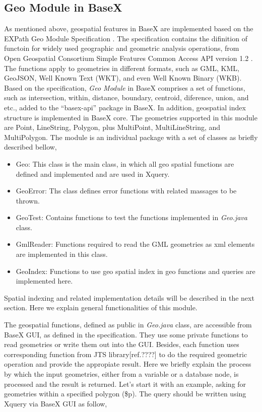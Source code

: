 \documentclass[a4paper,12pt]{article}
\begin{document}
\subsection{Geo Module in BaseX}
As mentioned above, geospatial features in BaseX are implemented based on the EXPath Geo Module Specification \cite{expath}. The specification contains the difinition of functoin for widely used geographic and geometric analysis operations, from Open Geospatial Consortium Simple Features Common Access API version 1.2 \cite{simpleFeature}. The functions apply to geometries in different formats, such as GML, KML, GeoJSON, Well Known Text (WKT), and even Well Known Binary (WKB). Based on the specification, \textit{Geo Module} in BaseX comprises a set of functions, such as intersection, within, distance, boundary, centroid, diference, union, and etc., added to the “basex-api” package in BaseX. In addition, geospatial index structure is implemented in BaseX core. The geometries supported in this module are Point, LineString, Polygon, plus MultiPoint, MultiLineString, and MultiPolygon. The module is an individual package with a set of classes as briefly described bellow,
\begin{itemize}
\item Geo: This class is the main class, in which all geo spatial functions are defined and implemented and are used in Xquery.
\item GeoError: Ths class defines error functions with related massages to be thrown.
\item GeoTest: Contains functions to test the functions implemented in \textit{Geo.java} class.
\item GmlReader: Functions required to read the GML geometries as xml elements are implemented in this class.
\item GeoIndex: Functions to use geo spatial index in geo functions and queries are implemented here. 
\end{itemize}

Spatial indexing and related implementation details will be described in the next section. Here we explain general functionalities of this module.

The geospatial functions, defined as public in \textit{Geo.java} class, are accessible from BaseX GUI, as defined in the specification. They use some private functions to read geometries or write them out into the GUI. Besides, each function uses corresponding function from JTS library[ref.????] to do the required geometric operation and provide the appropiate result. Here we briefly explain the process by which the input geometries, either from a variable or a database node, is processed and the result is returned.
Let's start it with an example, asking for geometries within a specified polygon (\$p). The query should be written using Xquery via BaseX GUI as follow,
\end{document}

